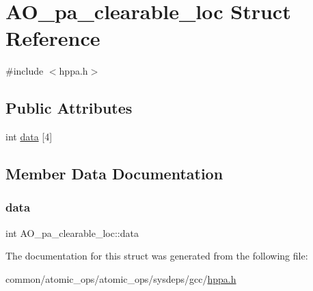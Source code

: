 \hypertarget{structAO__pa__clearable__loc}{}\section{A\+O\+\_\+pa\+\_\+clearable\+\_\+loc Struct Reference}
\label{structAO__pa__clearable__loc}


{\ttfamily \#include $<$hppa.\+h$>$}

\subsection*{Public Attributes}
\begin{DoxyCompactItemize}
\item 
int \hyperlink{structAO__pa__clearable__loc_a5ea6a3da3b379395d93f35baabc2388e}{data} \mbox{[}4\mbox{]}
\end{DoxyCompactItemize}


\subsection{Member Data Documentation}
\mbox{\label{structAO__pa__clearable__loc_a5ea6a3da3b379395d93f35baabc2388e}} 
\subsubsection{\texorpdfstring{data}{data}}
{\footnotesize\ttfamily int A\+O\+\_\+pa\+\_\+clearable\+\_\+loc\+::data}



The documentation for this struct was generated from the following file\+:\begin{DoxyCompactItemize}
\item 
common/atomic\+\_\+ops/atomic\+\_\+ops/sysdeps/gcc/\hyperlink{gcc_2hppa_8h}{hppa.\+h}\end{DoxyCompactItemize}
